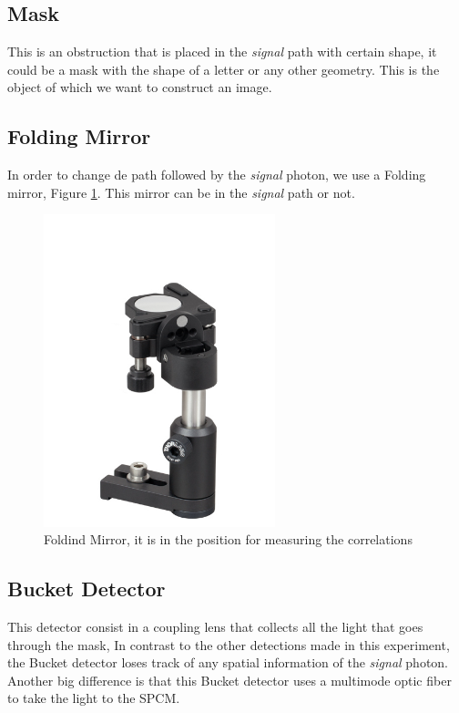 \subsection{Mask}
This is an obstruction that is placed in the \textit{signal} path with certain shape, it could be a mask with the shape of a letter or any other geometry. This is the object 
of which we want to construct an image.
\subsection{Folding Mirror}
In order to change de path followed by the \textit{signal} photon, we use a Folding mirror, Figure \ref{fig:foldingMirror}.
This mirror can be in the \textit{signal} path or not.
\begin{figure}[h]
\centering
 \includegraphics[width=0.6\textwidth]{Figures/foldingMirror.jpg}
 \caption{Foldind Mirror, it is in the position for measuring the correlations}
\label{fig:foldingMirror} 
\end{figure}

\subsection{Bucket Detector}
This detector consist in a coupling lens that collects all the light that goes through the mask, 
In contrast to the other detections made in this experiment, the Bucket detector loses track of any spatial information of the \textit{signal} photon. Another big difference is that this Bucket detector uses a multimode optic fiber to take the light to the SPCM.


